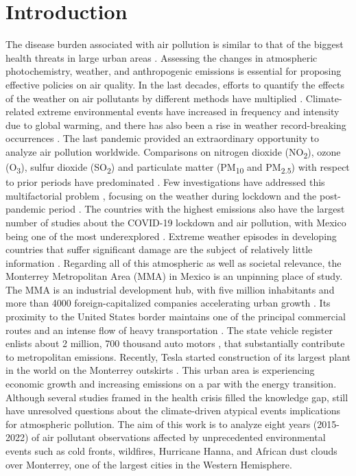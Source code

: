 \documentclass[sn-mathphys-num,iicol]{sn-jnl}
\begin{document}
\section{Introduction}
The disease burden associated with air pollution is similar to that of the biggest health threats in large urban areas \citep{organization2021}. Assessing the changes in atmospheric photochemistry, weather, and anthropogenic emissions is essential for proposing effective policies on air quality. In the last decades, efforts to quantify the effects of the weather on air pollutants by different methods have multiplied \citep{Zhang_2017,Shrestha_2022,Gong_2022,Ni_2023}. Climate-related extreme environmental events have increased in frequency and intensity due to global warming, and there has also been a rise in weather record-breaking occurrences \citep{Ni_2023,Clarke_2022,Swain_2020}. The last pandemic provided an extraordinary opportunity to analyze air pollution worldwide. Comparisons on nitrogen dioxide (NO\textsubscript{2}), ozone (O\textsubscript{3}), sulfur dioxide (SO\textsubscript{2}) and particulate matter (PM\textsubscript{10} and PM\textsubscript{2.5}) with respect to prior periods have predominated \citep{Kumari_2020,Bao2020,Berman_2020,Saha_2022,Han_2022}. Few investigations have addressed this multifactorial problem \citep{Sokhi2021,Bontempi_2022}, focusing on the weather during lockdown and the post-pandemic period \citep{Hernandez-Paniagua2021,ZORAN,Priya,Agrawal_2024}. The countries with the highest emissions also have the largest number of studies about the COVID-19 lockdown and air pollution, with Mexico being one of the most underexplored \citep{Aboagye}. Extreme weather episodes in developing countries that suffer significant damage are the subject of relatively little information \citep{Otto_2020}. Regarding all of this atmospheric as well as societal relevance, the Monterrey Metropolitan Area (MMA) in Mexico is an unpinning place of study. The MMA is an industrial development hub, with five million inhabitants and more than 4000 foreign-capitalized companies accelerating urban growth \citep{20152018}. Its proximity to the United States border maintains one of the principal commercial routes and an intense flow of heavy transportation \citep{cmm2019}. The state vehicle register enlists about 2 million, 700 thousand auto motors \citep{len}, that substantially contribute to metropolitan emissions. Recently, Tesla started construction of its largest plant in the world on the Monterrey outskirts \citep{tesla_2023}. This urban area is experiencing economic growth and increasing emissions on a par with the energy transition. Although several studies framed in the health crisis filled the knowledge gap, still have unresolved questions about the climate-driven atypical events implications for atmospheric pollution. The aim of this work is to analyze eight years (2015-2022) of air pollutant observations affected by unprecedented environmental events such as cold fronts, wildfires, Hurricane Hanna, and African dust clouds over Monterrey, one of the largest cities in the Western Hemisphere.
\end{document}
